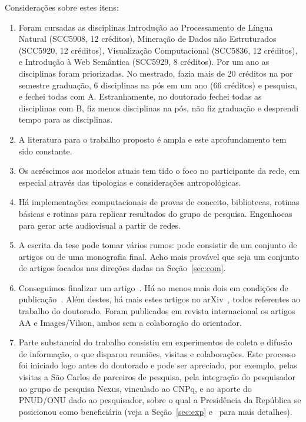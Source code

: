 \documentclass[a4paper,openright,12pt]{report} %
\begin{document}
Considerações sobre estes itens:
\begin{enumerate}
    \item Foram cursadas as disciplinas Introdução ao Processamento de Língua Natural (SCC5908, 12 créditos),
        Mineração de Dados não Estruturados (SCC5920, 12 créditos), 
        Visualização Computacional (SCC5836, 12 créditos),
        e Introdução à Web Semântica (SCC5929, 8 créditos).
        Por um ano as disciplinas foram priorizadas. 
        No mestrado, fazia mais de 20 créditos na por semestre graduação,
        6 disciplinas na pós em um ano (66 créditos) e pesquisa, e fechei todas com A.
        Estranhamente, no doutorado fechei todas as disciplinas com B, fiz menos disciplinas na pós,
        não fiz graduação e desprendi tempo para as disciplinas.
\item A literatura para o trabalho proposto é ampla e este aprofundamento tem sido constante.
\item Os acréscimos aos modelos atuais tem tido o foco no participante da rede, em especial através das tipologias e considerações antropológicas.
\item Há implementações computacionais de provas de conceito, bibliotecas, rotinas básicas e rotinas para replicar resultados do grupo de pesquisa. Engenhocas para gerar arte audiovisual a partir de redes.
\item A escrita da tese pode tomar vários rumos: pode consistir de um conjunto de artigos ou de uma monografia final. Acho mais provável que seja um conjunto de artigos focados nas direções dadas na Seção~\ref{sec:com}.
\item Conseguimos finalizar um artigo~\cite{timeS}. Há ao menos mais dois em condições de publicação~\cite{ops,mass}. Além destes, há mais estes artigos no arXiv~\cite{ensaio,connectiveDiff,XXX,YY}, todos referentes ao trabalho do doutorado. Foram publicados em revista internacional os artigos AA e Images/Vilson, ambos sem a colaboração do orientador.
\item Parte substancial do trabalho consistiu em experimentos de coleta e difusão de informação, o que disparou reuniões, visitas e colaborações. Este processo foi iniciado logo antes do doutorado e pode ser apreciado, por exemplo, pelas visitas a São Carlos de parceiros de pesquisa, pela integração do pesquisador ao grupo de pesquisa Nexus, vinculado ao CNPq, e ao aporte do PNUD/ONU dado ao pesquisador, sobre o qual a Presidência da República se posicionou como beneficiária (veja a Seção~\ref{sec:exp} e~\cite{ensaioAA} para mais detalhes).
\end{enumerate}
\end{document}
